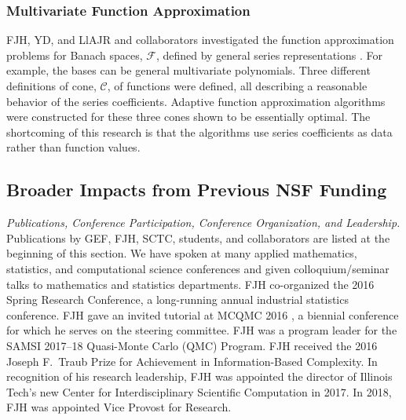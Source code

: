 \documentclass[11pt]{NSFamsart}
\newcommand{\calc}{{\mathcal{C}}}
\newcommand{\calf}{{\mathcal{F}}}
\begin{document}
\subsubsection{Multivariate Function Approximation} \label{sec:PrevFunAppx}

FJH, YD, and LlAJR and collaborators investigated the function approximation problems for Banach spaces, $\calf$, defined by general series representations \cite{DinHic20a,DinEtal20a}.  For example, the bases can be general multivariate polynomials.  Three different definitions of cone, $\calc$, of functions were defined, all describing a reasonable behavior of the series coefficients.  Adaptive function approximation algorithms were constructed for these three cones shown to be essentially optimal.  The shortcoming of this research is that the algorithms use series coefficients as data rather than function values. 


\subsection{Broader Impacts from Previous NSF Funding} \label{prevBIsect}

\emph{Publications, Conference Participation, Conference Organization, and Leadership.} Publications by GEF, FJH,  SCTC, students, and collaborators are listed at the beginning of this section.  We have spoken at many applied mathematics, statistics, 
and computational science conferences and given colloquium/seminar talks to mathematics and 
statistics departments.  FJH co-organized the 
2016 Spring Research 
Conference, a long-running annual industrial statistics conference.   FJH gave an invited tutorial
at MCQMC 2016
\cite{Hic17a}, a biennial conference for which he serves on the steering committee.  FJH 
was a program leader for the SAMSI 2017--18 Quasi-Monte Carlo (QMC) Program.   FJH received the 2016 Joseph F.\ Traub Prize for Achievement in Information-Based Complexity. In recognition of his research leadership, FJH was appointed the director of Illinois Tech's new Center for Interdisciplinary 
Scientific Computation in 2017.  In 2018, FJH was appointed Vice Provost for Research.
	
\end{document}
